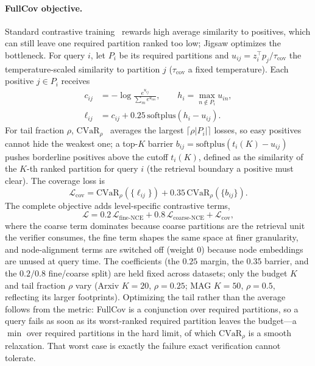 \documentclass[sigconf, nonacm]{acmart}
\begin{document}
\paragraph{FullCov objective.}
Standard contrastive training~\cite{ref_cpc} rewards high average similarity to positives, which can still leave one required partition ranked too low; Jigsaw optimizes the bottleneck. For query $i$, let $P_i$ be its required partitions and $u_{ij}=z_i^\top p_j/\tau_{\mathrm{cov}}$ the temperature-scaled similarity to partition $j$ ($\tau_{\mathrm{cov}}$ a fixed temperature). Each positive $j\in P_i$ receives
\begin{equation}
\begin{aligned}
c_{ij}&=-\log\frac{e^{u_{ij}}}{\sum_m e^{u_{im}}},\qquad
h_i=\max_{n\notin P_i}u_{in},\\[2pt]
\ell_{ij}&=c_{ij}+0.25\,\mathrm{softplus}(h_i-u_{ij}).
\end{aligned}
\end{equation}
For tail fraction $\rho$, $\mathrm{CVaR}_{\rho}$~\cite{ref_cvar} averages the largest $\lceil \rho|P_i|\rceil$ losses, so easy positives cannot hide the weakest one; a top-$K$ barrier $b_{ij}=\mathrm{softplus}(t_i(K)-u_{ij})$ pushes borderline positives above the cutoff $t_i(K)$, defined as the similarity of the $K$-th ranked partition for query $i$ (the retrieval boundary a positive must clear). The coverage loss is
\begin{equation}
\mathcal{L}_{\mathrm{cov}}=\mathrm{CVaR}_{\rho}(\{\ell_{ij}\})+0.35\,\mathrm{CVaR}_{\rho}(\{b_{ij}\}).
\end{equation}
The complete objective adds level-specific contrastive terms,
\begin{equation}
\mathcal{L}=0.2\,\mathcal{L}_{\mathrm{fine\text{-}NCE}}+0.8\,\mathcal{L}_{\mathrm{coarse\text{-}NCE}}+\mathcal{L}_{\mathrm{cov}},
\end{equation}
where the coarse term dominates because coarse partitions are the retrieval unit the verifier consumes, the fine term shapes the same space at finer granularity, and node-alignment terms are switched off (weight $0$) because node embeddings are unused at query time. The coefficients (the $0.25$ margin, the $0.35$ barrier, and the $0.2/0.8$ fine/coarse split) are held fixed across datasets; only the budget $K$ and tail fraction $\rho$ vary (Arxiv $K{=}20$, $\rho{=}0.25$; MAG $K{=}50$, $\rho{=}0.5$, reflecting its larger footprints). Optimizing the tail rather than the average follows from the metric: FullCov is a conjunction over required partitions, so a query fails as soon as its worst-ranked required partition leaves the budget---a $\min$ over required partitions in the hard limit, of which $\mathrm{CVaR}_{\rho}$ is a smooth relaxation. That worst case is exactly the failure exact verification cannot tolerate.
\end{document}
